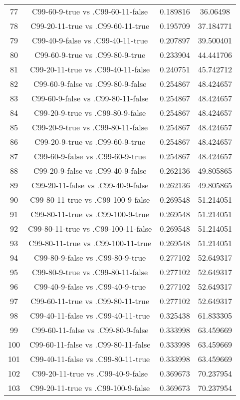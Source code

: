 \documentclass[a4paper,10pt]{article}
\begin{document}
\begin{landscape}
\begin{table}[!htp]
\begin{tabular}{cccc}
77&C99-60-9-true vs .C99-60-11-false&0.189816&36.06498\\
78&C99-20-11-true vs .C99-60-11-true&0.195709&37.184771\\
79&C99-40-9-false vs .C99-40-11-true&0.207897&39.500401\\
80&C99-60-9-true vs .C99-80-9-true&0.233904&44.441706\\
81&C99-20-11-true vs .C99-40-11-false&0.240751&45.742712\\
82&C99-60-9-false vs .C99-80-9-false&0.254867&48.424657\\
83&C99-60-9-false vs .C99-80-11-false&0.254867&48.424657\\
84&C99-20-9-true vs .C99-80-9-false&0.254867&48.424657\\
85&C99-20-9-true vs .C99-80-11-false&0.254867&48.424657\\
86&C99-20-9-true vs .C99-60-9-true&0.254867&48.424657\\
87&C99-60-9-false vs .C99-60-9-true&0.254867&48.424657\\
88&C99-20-9-false vs .C99-40-9-false&0.262136&49.805865\\
89&C99-20-11-false vs .C99-40-9-false&0.262136&49.805865\\
90&C99-80-11-true vs .C99-100-9-false&0.269548&51.214051\\
91&C99-80-11-true vs .C99-100-9-true&0.269548&51.214051\\
92&C99-80-11-true vs .C99-100-11-false&0.269548&51.214051\\
93&C99-80-11-true vs .C99-100-11-true&0.269548&51.214051\\
94&C99-80-9-false vs .C99-80-9-true&0.277102&52.649317\\
95&C99-80-9-true vs .C99-80-11-false&0.277102&52.649317\\
96&C99-40-9-false vs .C99-40-9-true&0.277102&52.649317\\
97&C99-60-11-true vs .C99-80-11-true&0.277102&52.649317\\
98&C99-40-11-false vs .C99-40-11-true&0.325438&61.833305\\
99&C99-60-11-false vs .C99-80-9-false&0.333998&63.459669\\
100&C99-60-11-false vs .C99-80-11-false&0.333998&63.459669\\
101&C99-40-11-false vs .C99-80-11-true&0.333998&63.459669\\
102&C99-20-11-true vs .C99-40-9-false&0.369673&70.237954\\
103&C99-20-11-true vs .C99-100-9-false&0.369673&70.237954\\

\end{tabular}
\end{table}
\end{landscape}
\end{document}
